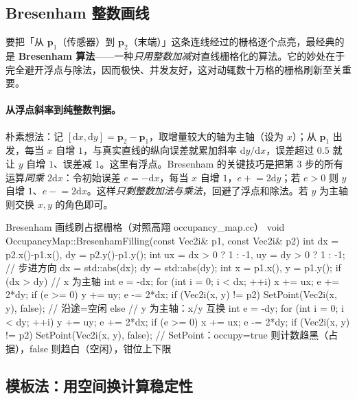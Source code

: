 \subsection{Bresenham 整数画线}
\label{sec:slam2d-bresenham}

要把「从 $\mathbf{p}_1$（传感器）到 $\mathbf{p}_2$（末端）」这条连线经过的栅格逐个点亮，最经典的是 \textbf{Bresenham 算法}——一种\emph{只用整数加减}对直线栅格化的算法。它的妙处在于完全避开浮点与除法，因而极快、并发友好，这对动辄数十万格的栅格刷新至关重要。

\paragraph{从浮点斜率到纯整数判据。}
朴素想法：记 $[\mathrm{d}x,\mathrm{d}y]=\mathbf{p}_2-\mathbf{p}_1$，取增量较大的轴为主轴（设为 $x$）；从 $\mathbf{p}_1$ 出发，每当 $x$ 自增 $1$，与真实直线的纵向误差就累加斜率 $\mathrm{d}y/\mathrm{d}x$，误差超过 $0.5$ 就让 $y$ 自增 $1$、误差减 $1$。这里有浮点。Bresenham 的关键技巧是把第 $3$ 步的所有运算\emph{同乘 $2\mathrm{d}x$}：令初始误差 $e=-\mathrm{d}x$，每当 $x$ 自增 $1$，$e\mathrel{+}=2\mathrm{d}y$；若 $e>0$ 则 $y$ 自增 $1$、$e\mathrel{-}=2\mathrm{d}x$。这样\emph{只剩整数加法与乘法}，回避了浮点和除法。若 $y$ 为主轴则交换 $x,y$ 的角色即可。

\begin{codebox}[C++]{Bresenham 画线刷占据栅格（对照高翔 occupancy\_map.cc）}
void OccupancyMap::BresenhamFilling(const Vec2i& p1, const Vec2i& p2) {
  int dx = p2.x()-p1.x(), dy = p2.y()-p1.y();
  int ux = dx > 0 ? 1 : -1,  uy = dy > 0 ? 1 : -1;     // 步进方向
  dx = std::abs(dx); dy = std::abs(dy);
  int x = p1.x(), y = p1.y();
  if (dx > dy) {                                        // x 为主轴
    int e = -dx;
    for (int i = 0; i < dx; ++i) {
      x += ux;  e += 2*dy;
      if (e >= 0) { y += uy; e -= 2*dx; }
      if (Vec2i(x, y) != p2) SetPoint(Vec2i(x, y), false); // 沿途=空闲
    }
  } else {                                              // y 为主轴：x/y 互换
    int e = -dy;
    for (int i = 0; i < dy; ++i) {
      y += uy;  e += 2*dx;
      if (e >= 0) { x += ux; e -= 2*dy; }
      if (Vec2i(x, y) != p2) SetPoint(Vec2i(x, y), false);
    }
  }
}
// SetPoint：occupy=true 则计数趋黑（占据），false 则趋白（空闲），钳位上下限
\end{codebox}

\subsection{模板法：用空间换计算稳定性}
\label{sec:slam2d-template}

